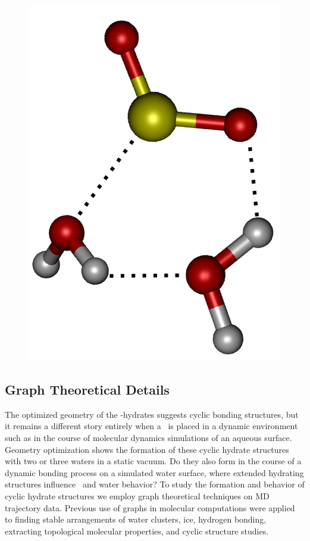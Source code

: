 \begin{figure}[h!]
	\begin{center}
		\includegraphics[scale=1.0]{images/cycles/double-cycle-type2-small.png}
		\caption{}
		\label{fig:cyclic-example}
	\end{center}
\end{figure}

\subsection {Graph Theoretical Details}
The optimized geometry of the \suldiox-hydrates suggests cyclic bonding structures, but it remains a different story entirely when a \suldiox~is placed in a dynamic environment such as in the course of molecular dynamics simulations of an aqueous surface. Geometry optimization shows the formation of these cyclic hydrate structures with two or three waters in a static vacuum. Do they also form in the course of a dynamic bonding process on a simulated water surface, where extended hydrating structures influence \suldiox~and water behavior? To study the formation and behavior of cyclic hydrate structures we employ graph theoretical techniques on MD trajectory data. Previous use of graphs in molecular computations were applied to finding stable arrangements of water clusters, ice, hydrogen bonding, extracting topological molecular properties, and cyclic structure studies.\cite{Anick2002, Huber2007, Radhakrishnan1991, Shi2005, Garcia2004, McDonald1998}

